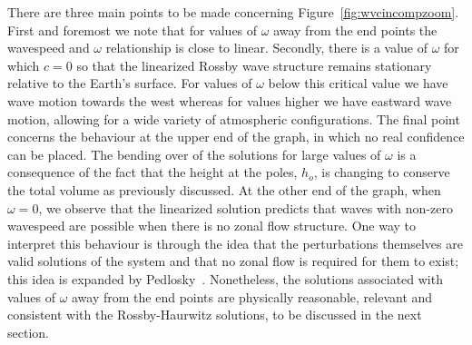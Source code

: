 There are three main points to be made concerning Figure~\ref{fig:wvcincompzoom}. First and foremost we note that for values of $\omega$ away from the end points the wavespeed and $\omega$ relationship is close to linear. Secondly, there is a value of $\omega$ for which $c=0$ so that the linearized Rossby wave structure remains stationary relative to the Earth's surface. For values of $\omega$ below this critical value we have wave motion towards the west whereas for values higher we have eastward wave motion, allowing for a wide variety of atmospheric configurations. The final point concerns the behaviour at the upper end of the graph, in which no real confidence can be placed. The bending over of the solutions for large values of $\omega$ is a consequence of the fact that the height at the poles, $h_o$, is changing to conserve the total volume as previously discussed. At the other end of the graph, when $\omega=0$, we observe that the linearized solution predicts that waves with non-zero wavespeed are possible when there is no zonal flow structure. One way to interpret this behaviour is through the idea that the perturbations themselves are valid solutions of the system and that no zonal flow is required for them to exist; this idea is expanded by Pedlosky~\cite[pages 108--110]{Pedlosky:GFD}. Nonetheless, the solutions associated with values of $\omega$ away from the end points are physically reasonable, relevant and consistent with the Rossby-Haurwitz solutions, to be discussed in the next section.

